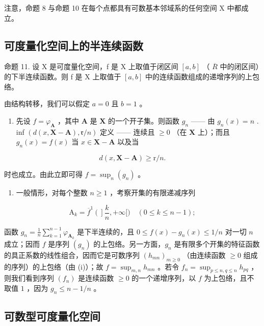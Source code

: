 注意，命题 8 与命题 10 在每个点都具有可数基本邻域系的任何空间 X 中都成立。

\subsection{可度量化空间上的半连续函数}

命题 11. 设 X 是可度量化空间，f 是 X 上取值于闭区间 \([a, b]\) （ \(\overline{R}\) 中的闭区间）的下半连续函数。则 f 是 X 上取值于 \([a, b]\) 中的连续函数组成的递增序列的上包络。

由结构转移，我们可以假定 \(a = 0\) 且 \(b = 1\) 。

\begin{enumerate}
\def\labelenumi{(\roman{enumi})}
\tightlist
\item
  先设 \(f = \varphi_{\mathbf{A}}\) ，其中 \(\mathbf{A}\) 是 \(\mathbf{X}\) 的一个开子集。则函数 \(g_n\) —— 由 \(g_n(x) = n\) . inf \((d(x, \mathbf{X} - \mathbf{A}), \mathfrak{r}/n)\) 定义 —— 连续且 \(\geqslant 0\) （在 \(\mathbf{X}\) 上）；而且 \(g_n(x) = f(x)\) 当 \(x \in \mathbf{X} - \mathbf{A}\) 以及当
\end{enumerate}

\[
d (x, \mathbf {X} - \mathbf {A}) \geqslant \mathrm{r} / n.
\]

时也成立。由此立即可得 \(f = \sup_{n}(g_n)\) 。

\begin{enumerate}
\def\labelenumi{(\roman{enumi})}
\setcounter{enumi}{1}
\tightlist
\item
  一般情形，对每个整数 \(n \geqslant 1\) ，考察开集的有限递减序列
\end{enumerate}

\[
\mathrm{A} _ {k} = \overline {{{f}}} ^ {1} \left(\right] \frac {k}{n}, + \infty [) \quad (0 \leqslant k \leqslant n - 1);
\]

函数 \(g_{n} = \frac{1}{n}\sum_{k=1}^{n-1}\varphi_{\mathbf{A}_k}\) 是下半连续的，且 \(0 \leqslant f(x) - g_{n}(x) \leqslant 1/n\) 对一切 \(n\) 成立；因而 \(f\) 是序列 \((g_n)\) 的上包络。另一方面，\(g_{n}\) 是有限多个开集的特征函数的具正系数的线性组合，因而它是可数序列 \((h_{mn})_{m \geqslant 0}\) （由连续函数 \(\geqslant 0\) 组成的序列）的上包络（由 (i)）；故 \(f = \sup_{m,n} h_{mn}\) 。若令 \(f_{n} = \sup_{p \leqslant n, q \leqslant n} h_{pq}\) ，则我们看到序列 \((f_n)\) 是连续函数 \(\geqslant 0\) 的一个递增序列，以 \(f\) 为上包络，且不取值 \(1\) ，因为 \(g_{n} \leqslant n - 1/n\) 。

\subsection{可数型可度量化空间}

